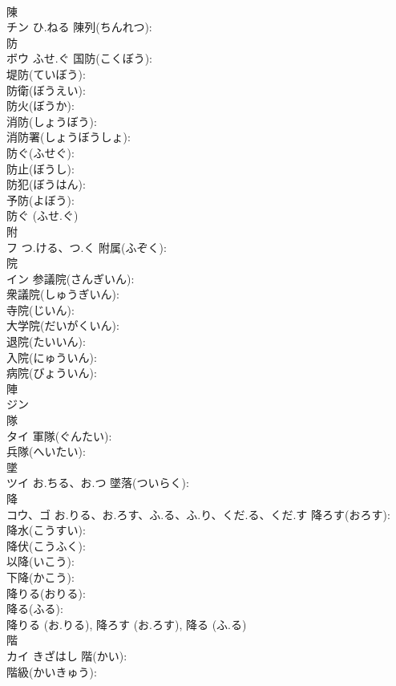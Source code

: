 \documentclass[8pt]{extreport}
\begin{document}
\begin{CJK}{UTF8}{min}
\\	陳			
\\	チン	ひ.ねる	陳列(ちんれつ): 
\\	防			
\\	ボウ	ふせ.ぐ	国防(こくぼう): 
\\	堤防(ていぼう): 
\\	防衛(ぼうえい): 
\\	防火(ぼうか): 
\\	消防(しょうぼう): 
\\	消防署(しょうぼうしょ): 
\\	防ぐ(ふせぐ): 
\\	防止(ぼうし): 
\\	防犯(ぼうはん): 
\\	予防(よぼう): 
\\	防ぐ (ふせ.ぐ)
\\	附			
\\	フ	つ.ける、つ.く	附属(ふぞく): 
\\	院			
\\	イン		参議院(さんぎいん): 
\\	衆議院(しゅうぎいん): 
\\	寺院(じいん): 
\\	大学院(だいがくいん): 
\\	退院(たいいん): 
\\	入院(にゅういん): 
\\	病院(びょういん): 
\\	陣			
\\	ジン			
\\	隊			
\\	タイ		軍隊(ぐんたい): 
\\	兵隊(へいたい): 
\\	墜			
\\	ツイ	お.ちる、お.つ	墜落(ついらく): 
\\	降			
\\	コウ、ゴ	お.りる、お.ろす、ふ.る、ふ.り、くだ.る、くだ.す	降ろす(おろす): 
\\	降水(こうすい): 
\\	降伏(こうふく): 
\\	以降(いこう): 
\\	下降(かこう): 
\\	降りる(おりる): 
\\	降る(ふる): 
\\	降りる (お.りる), 降ろす (お.ろす), 降る (ふ.る)
\\	階			
\\	カイ	きざはし	階(かい): 
\\	階級(かいきゅう): 

\end{CJK}
\end{document}
